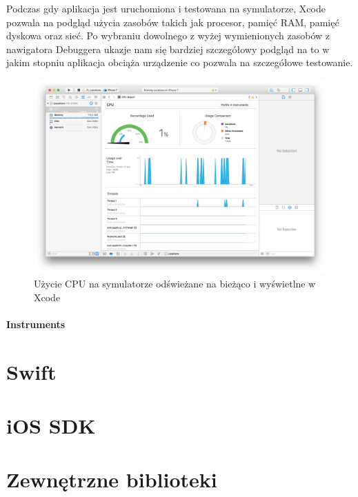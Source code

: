 Podczas gdy aplikacja jest uruchomiona i testowana na symulatorze, Xcode pozwala na podgląd użycia zasobów takich jak procesor, pamięć
RAM, pamięć dyskowa oraz sieć. Po wybraniu dowolnego z wyżej wymienionych zasobów z nawigatora Debuggera ukazje nam się bardziej
szczegółowy podgląd na to w jakim stopniu aplikacja obciąża urządzenie co pozwala na szczegółowe testowanie.

\begin{figure}[ht!]
  \centering
  \includegraphics[width=120mm]{images/chapter-2-image-5-debugger.png}
  \caption{Użycie CPU na symulatorze odświeżane na bieżąco i wyświetlne w Xcode}
  \label{overflow}
\end{figure}

\paragraph{Instruments}

\section{Swift}

\section{iOS SDK}

\section{Zewnętrzne biblioteki}
